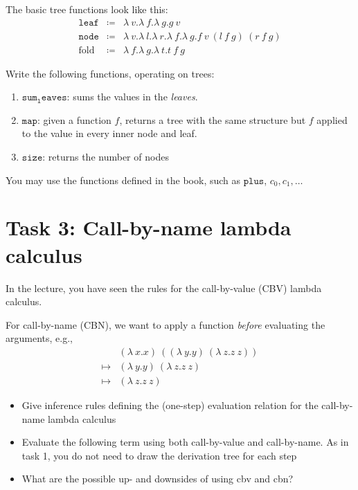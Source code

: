 The basic tree functions look like this:
\begin{align*}
  \mathtt{leaf} & \coloneq & \lambda\ v.\lambda\ f.\lambda\ g.g\ v \\
  \mathtt{node} & \coloneq & \lambda\ v.\lambda\ l.\lambda\ r.\lambda\ f.\lambda\ g.f\ v\ (l\ f\ g)\ (r\ f\ g) \\
  \mathrm{fold} & \coloneq & \lambda\ f.\lambda\ g.\lambda\ t.t\ f\ g
\end{align*}

Write the following functions, operating on trees:
\begin{enumerate}
  \item $\mathtt{sum_leaves}$: sums the values in the \emph{leaves}.
  \item $\mathtt{map}$: given a function $f$, returns a tree with the same structure but $f$ applied to the value in every inner node and leaf.
  \item $\mathtt{size}$: returns the number of nodes
\end{enumerate}

You may use the functions defined in the book, such as $\mathtt{plus}$, $c_0,c_1,\dots$

\section*{Task 3: Call-by-name lambda calculus}

In the lecture, you have seen the rules for the call-by-value (CBV) lambda calculus.

For call-by-name (CBN), we want to apply a function \emph{before} evaluating the arguments, e.g.,
\begin{align*}
  & (\lambda\ x.x)\ ((\lambda\ y.y)\ (\lambda\ z.z\ z)) \\
  \mapsto & (\lambda\ y.y)\ (\lambda\ z.z\ z)\\
  \mapsto & (\lambda\ z.z\ z)
\end{align*}

\begin{itemize}
  \item Give inference rules defining the (one-step) evaluation relation for the call-by-name lambda calculus
  \item Evaluate the following term using both call-by-value and call-by-name. As in task 1, you do not need to draw the derivation tree for each step
  \item What are the possible up- and downsides of using cbv and cbn?
\end{itemize}

